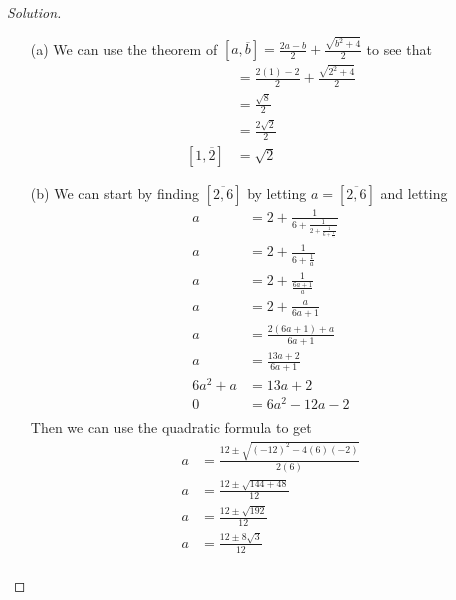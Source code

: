 \documentclass[11pt]{article}
\newenvironment{solution}
  {\renewcommand\qedsymbol{$~$}\begin{proof}[Solution]$ $\par\nobreak\ignorespaces}
  {\end{proof}}
\begin{document}
\begin{solution}
  \begin{itemize}
    \item [(a)] We can use the theorem of $[a,\overline{b}]=\frac{2a-b}{2}+\frac{\sqrt{b^2+4}}{2}$ to see that
          \begin{align*}
            [1,\overline{2} ] & = \frac{2(1)-2}{2}+\frac{\sqrt{2^2+4}}{2} \\
                              & = \frac{\sqrt{8}}{2}                      \\
                              & = \frac{2\sqrt{2}}{2}                     \\
            [1,\overline{2} ] & = \sqrt{2}
          \end{align*}
    \item [(b)] We can start by finding $[\overline{2,6}]$ by letting $a= [\overline{2,6}]$ and letting
          \begin{align*}
            a      & = 2 + \frac{1}{6 + \frac{1}{2 + \frac{1}{6 + \frac{1}{\ddots}}}} \\
            a      & = 2 + \frac{1}{6 + \frac{1}{a}}                                  \\
            a      & = 2 + \frac{1}{\frac{6a + 1}{a}}                                 \\
            a      & = 2 + \frac{a}{6a+1}                                             \\
            a      & = \frac{2(6a+1) +a}{6a+1}                                        \\
            a      & = \frac{13a+2}{6a+1}                                             \\
            6a^2+a & = 13a+2                                                          \\
            0      & = 6a^2 -12a-  2                                                  \\
          \end{align*}
          Then we can use the quadratic formula to get
          \begin{align*}
            a & = \frac{12\pm \sqrt{(-12)^2-4(6)(-2)}}{2(6)} \\
            a & = \frac{12\pm \sqrt{144+48}}{12}             \\
            a & = \frac{12\pm \sqrt{192}}{12}                \\
            a & =  \frac{12\pm 8 \sqrt{3}}{12}               \\

\end{align*}
\end{itemize}
\end{solution}
\end{document}

